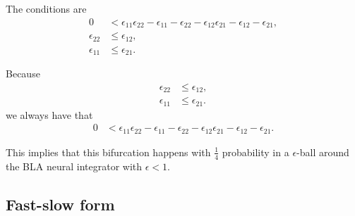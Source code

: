 \documentclass{article} %
\newcounter{ct}
\theoremstyle{definition}
\theoremstyle{remark}
\begin{document}
The conditions are 
\begin{align*}
0 &< \epsilon_{11}\epsilon_{22}-\epsilon_{11}-\epsilon_{22}-\epsilon_{12}\epsilon_{21}-\epsilon_{12}-\epsilon_{21},\\
\epsilon_{22} &\leq \epsilon_{12},\\
\epsilon_{11} &\leq \epsilon_{21}.
\end{align*}


Because
\begin{align*}
\epsilon_{22} &\leq \epsilon_{12},\\
\epsilon_{11} &\leq \epsilon_{21}.
\end{align*}
we always have that
\begin{align*}
0 &< \epsilon_{11}\epsilon_{22}-\epsilon_{11}-\epsilon_{22}-\epsilon_{12}\epsilon_{21}-\epsilon_{12}-\epsilon_{21}.
\end{align*}


This implies that this bifurcation happens with $\frac{1}{4}$ probability in a $\epsilon$-ball around the BLA neural integrator with $\epsilon<1$.


\subsection{Fast-slow form}\label{sec:supp:fast_slow_form}
\end{document}
